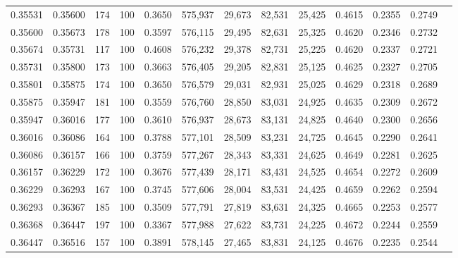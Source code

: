 \begin{tabular}{rrrrrrrrrrrrr}
0.35531 & 0.35600 &   174 & 100 &                                     0.3650 & 575,937 &  29,673 &  82,531 &  25,425 & 0.4615 & 0.2355 & 0.2749 \\
0.35600 & 0.35673 &   178 & 100 &                                     0.3597 & 576,115 &  29,495 &  82,631 &  25,325 & 0.4620 & 0.2346 & 0.2732 \\
0.35674 & 0.35731 &   117 & 100 &                                     0.4608 & 576,232 &  29,378 &  82,731 &  25,225 & 0.4620 & 0.2337 & 0.2721 \\
0.35731 & 0.35800 &   173 & 100 &                                     0.3663 & 576,405 &  29,205 &  82,831 &  25,125 & 0.4625 & 0.2327 & 0.2705 \\
0.35801 & 0.35875 &   174 & 100 &                                     0.3650 & 576,579 &  29,031 &  82,931 &  25,025 & 0.4629 & 0.2318 & 0.2689 \\
0.35875 & 0.35947 &   181 & 100 &                                     0.3559 & 576,760 &  28,850 &  83,031 &  24,925 & 0.4635 & 0.2309 & 0.2672 \\
0.35947 & 0.36016 &   177 & 100 &                                     0.3610 & 576,937 &  28,673 &  83,131 &  24,825 & 0.4640 & 0.2300 & 0.2656 \\
0.36016 & 0.36086 &   164 & 100 &                                     0.3788 & 577,101 &  28,509 &  83,231 &  24,725 & 0.4645 & 0.2290 & 0.2641 \\
0.36086 & 0.36157 &   166 & 100 &                                     0.3759 & 577,267 &  28,343 &  83,331 &  24,625 & 0.4649 & 0.2281 & 0.2625 \\
0.36157 & 0.36229 &   172 & 100 &                                     0.3676 & 577,439 &  28,171 &  83,431 &  24,525 & 0.4654 & 0.2272 & 0.2609 \\
0.36229 & 0.36293 &   167 & 100 &                                     0.3745 & 577,606 &  28,004 &  83,531 &  24,425 & 0.4659 & 0.2262 & 0.2594 \\
0.36293 & 0.36367 &   185 & 100 &                                     0.3509 & 577,791 &  27,819 &  83,631 &  24,325 & 0.4665 & 0.2253 & 0.2577 \\
0.36368 & 0.36447 &   197 & 100 &                                     0.3367 & 577,988 &  27,622 &  83,731 &  24,225 & 0.4672 & 0.2244 & 0.2559 \\
0.36447 & 0.36516 &   157 & 100 &                                     0.3891 & 578,145 &  27,465 &  83,831 &  24,125 & 0.4676 & 0.2235 & 0.2544 \\

\end{tabular}
